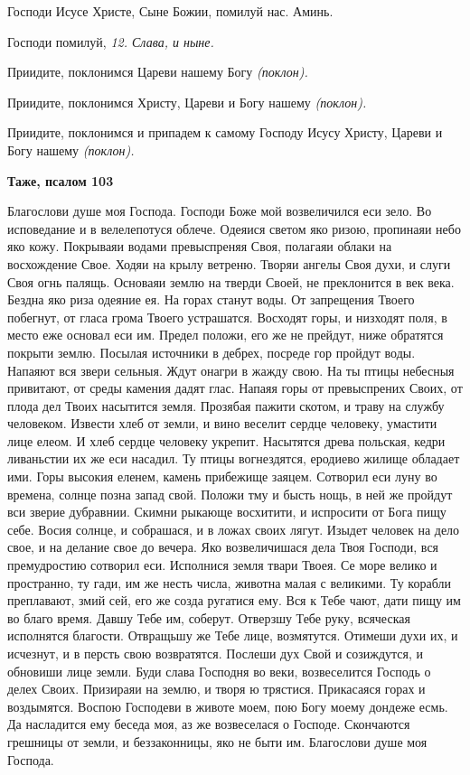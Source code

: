    Господи Исусе Христе, Сыне Божии, помилуй нас. Аминь.


   Господи помилуй, \itshape 12\normalfont{}. \itshape Слава, и ныне\normalfont{}.


   Приидите, поклонимся Цареви нашему Богу \itshape (поклон)\normalfont{}.


   Приидите, поклонимся Христу, Цареви и Богу нашему \itshape (поклон)\normalfont{}.


   Приидите, поклонимся и припадем к самому Господу Исусу Христу,
Цареви и Богу нашему \itshape (поклон)\normalfont{}.







 

\bfseries Таже, псалом 103\normalfont{}


   Благослови душе моя Господа. Господи Боже мой возвеличился еси зело.
Во исповедание и в велелепотуся облече. Одеяися светом яко ризою,
пропинаяи небо яко кожу. Покрываяи водами превыспреняя Своя, полагаяи
облаки на восхождение Свое. Ходяи на крылу ветреню. Творяи ангелы
Своя духи, и слуги Своя огнь палящь. Основаяи землю на тверди
Своей, не преклонится в век века. Бездна яко риза одеяние ея. На
горах станут воды. От запрещения Твоего побегнут, от гласа грома
Твоего устрашатся. Восходят горы, и низходят поля, в место еже
основал еси им. Предел положи, его же не прейдут, ниже обратятся
покрыти землю. Посылая источники в дебрех, посреде гор пройдут воды.
Напаяют вся звери сельныя. Ждут онагри в жажду свою. На ты птицы
небесныя привитают, от среды камения дадят глас. Напаяя горы от
превыспрених Своих, от плода дел Твоих насытится земля. Прозябая
пажити скотом, и траву на службу человеком. Извести хлеб от земли, и вино
веселит сердце человеку, умастити лице елеом. И хлеб сердце человеку
укрепит. Насытятся древа польская, кедри ливаньстии их же еси
насадил. Ту птицы вогнездятся, еродиево жилище обладает ими. Горы
высокия еленем, камень прибежище заяцем. Сотворил еси луну во
времена, солнце позна запад свой. Положи тму и бысть нощь, в ней
же пройдут вси зверие дубравнии. Скимни рыкающе восхитити, и
испросити от Бога пищу себе. Восия солнце, и собрашася, и в ложах своих
лягут. Изыдет человек на дело свое, и на делание свое до вечера.
Яко возвеличишася дела Твоя Господи, вся премудростию сотворил
еси. Исполнися земля твари Твоея. Се море велико и пространно, ту
гади, им же несть числа, животна малая с великими. Ту корабли
преплавают, змий сей, его же созда ругатися ему. Вся к Тебе чают,
дати пищу им во благо время. Давшу Тебе им, соберут. Отверзшу
Тебе руку, всяческая исполнятся благости. Отвращьшу же Тебе лице,
возмятутся. Отимеши духи их, и исчезнут, и в персть свою возвратятся.
Послеши дух Свой и созиждутся, и обновиши лице земли. Буди слава
Господня во веки, возвеселится Господь о делех Своих. Призираяи на
землю, и творя ю трястися. Прикасаяся горах и воздымятся. Воспою
Господеви в животе моем, пою Богу моему дондеже есмь. Да насладится
ему беседа моя, аз же возвеселася о Господе. Скончаются грешницы
от земли, и беззаконницы, яко не быти им. Благослови душе моя
Господа.


